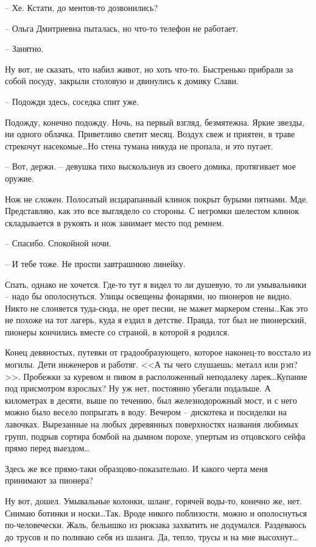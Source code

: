 \documentclass[a4paper]{book}
\begin{document}
-- Хе. Кстати, до ментов-то дозвонились?

-- Ольга Дмитриевна пыталась, но что-то телефон не работает.

-- Занятно. 

Ну вот, не сказать, что набил живот, но хоть что-то. Быстренько прибрали за собой посуду, закрыли столовую и двинулись к домику Слави. 


-- Подожди здесь, соседка спит уже.

Подожду, конечно подожду. Ночь, на первый взгляд, безмятежна. Яркие звезды, ни одного облачка.  Приветливо светит месяц. Воздух свеж и приятен, в траве стрекочут насекомые\ldots Но стена тумана никуда не пропала, и это пугает. 


-- Вот, держи. -- девушка тихо выскользнув из своего домика, протягивает мое оружие. 

Нож не сложен. Полосатый исцарапанный клинок покрыт бурыми пятнами. Мде. Представляю, как это все выглядело со стороны. С негромки шелестом клинок складывается в рукоять и нож занимает место под ремнем.


-- Спасибо. Спокойной ночи.

-- И тебе тоже. Не проспи завтрашнюю линейку.

Спать, однако не хочется. Где-то тут я видел то ли душевую, то ли умывальники -- надо бы ополоснуться. Улицы освещены фонарями, но пионеров не видно. Никто не слоняется туда-сюда, не  орет песни, не мажет маркером стены\ldots Как это не похоже на тот лагерь, куда я ездил в детстве. Правда, тот был не пионерский, пионеры кончились вместе со страной, в которой я родился. 

Конец девяностых, путевки от градообразующего, которое наконец-то восстало из могилы. Дети инженеров и работяг. <<А ты чего слушаешь: металл или рэп?>>. Пробежки за куревом и пивом в расположенный неподалеку ларек\ldots Купание под присмотром взрослых? Ну уж нет, постоянно убегали подальше. А километрах в десяти, выше по течению, был железнодорожный мост, и с него можно было весело попрыгать в воду. Вечером -- дискотека и посиделки на лавочках. Вырезанные на любых деревянных поверхностях названия любимых групп, подрыв сортира бомбой на дымном порохе, упертым из отцовского сейфа прямо перед выездом\ldots 

Здесь же все прямо-таки образцово-показательно. И какого черта меня принимают за пионера? 

Ну вот, дошел. Умывальные колонки, шланг, горячей воды-то, конечно же, нет. Снимаю ботинки и носки\ldots Так. Вроде никого поблизости, можно и ополоснуться по-человечески. Жаль, бельишко из рюкзака захватить не додумался. Раздеваюсь до трусов и по поливаю себя из шланга. Да, тепло, трусы и на мне высохнут\ldots
\end{document}

